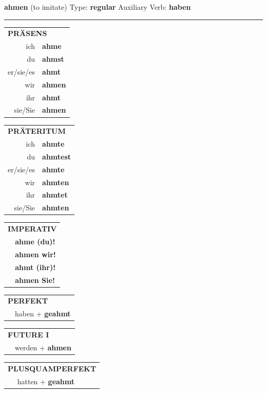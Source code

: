 \documentclass[10pt,a4paper]{revtex4-2}
\begin{document}
\begin{verbbox}
{\Large \bf ahmen} (to imitate) \hfill Type: \textbf{regular} \hfill Auxiliary Verb: \textbf{haben}

\vspace{5pt}
\hrule
\vspace{5pt}

\begin{tabular}{rl}
\multicolumn{2}{l}{\textbf{PRÄSENS}}\\
ich & \textbf{ahme}\\
du & \textbf{ahmst}\\
er/sie/es & \textbf{ahmt}\\
wir & \textbf{ahmen}\\
ihr & \textbf{ahmt}\\
sie/Sie & \textbf{ahmen}\\
\end{tabular}
\hfill
\begin{tabular}{rl}
\multicolumn{2}{l}{\textbf{PRÄTERITUM}}\\
ich & \textbf{ahmte}\\
du & \textbf{ahmtest}\\
er/sie/es & \textbf{ahmte}\\
wir & \textbf{ahmten}\\
ihr & \textbf{ahmtet}\\
sie/Sie & \textbf{ahmten}\\
\end{tabular}
\hfill
\begin{tabular}{rl}
\multicolumn{2}{l}{\textbf{IMPERATIV}}\\
& \textbf{ahme (du)!}\\
& \textbf{ahmen wir!}\\
& \textbf{ahmt (ihr)!}\\
& \textbf{ahmen Sie!}\\
\end{tabular}

\vspace{10pt}

\begin{tabular}{rl}
\multicolumn{2}{l}{\textbf{PERFEKT}}\\
& haben + \textbf{geahmt}\\
\end{tabular}
\hfill
\begin{tabular}{rl}
\multicolumn{2}{l}{\textbf{FUTURE I}}\\
& werden + \textbf{ahmen}\\
\end{tabular}
\hfill
\begin{tabular}{rl}
\multicolumn{2}{l}{\textbf{PLUSQUAMPERFEKT}}\\
& hatten + \textbf{geahmt}\\
\end{tabular}


\end{verbbox}
\end{document}
